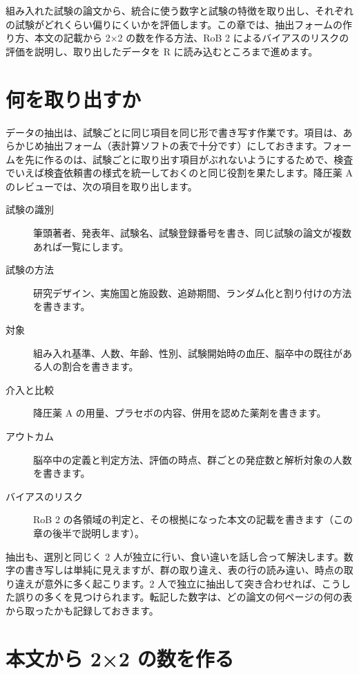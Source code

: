 \begin{chapintro}
組み入れた試験の論文から、統合に使う数字と試験の特徴を取り出し、それぞれの試験がどれくらい偏りにくいかを評価します。この章では、抽出フォームの作り方、本文の記載から 2×2 の数を作る方法、RoB 2 によるバイアスのリスクの評価を説明し、取り出したデータを R に読み込むところまで進めます。
\end{chapintro}

\section{何を取り出すか}
\label{sec:04-1}

データの抽出は、試験ごとに同じ項目を同じ形で書き写す作業です。項目は、あらかじめ抽出フォーム（表計算ソフトの表で十分です）にしておきます。フォームを先に作るのは、試験ごとに取り出す項目がぶれないようにするためで、検査でいえば検査依頼書の様式を統一しておくのと同じ役割を果たします。降圧薬 A のレビューでは、次の項目を取り出します。

\begin{description}
\item[試験の識別] 筆頭著者、発表年、試験名、試験登録番号を書き、同じ試験の論文が複数あれば一覧にします。
\item[試験の方法] 研究デザイン、実施国と施設数、追跡期間、ランダム化と割り付けの方法を書きます。
\item[対象] 組み入れ基準、人数、年齢、性別、試験開始時の血圧、脳卒中の既往がある人の割合を書きます。
\item[介入と比較] 降圧薬 A の用量、プラセボの内容、併用を認めた薬剤を書きます。
\item[アウトカム] 脳卒中の定義と判定方法、評価の時点、群ごとの発症数と解析対象の人数を書きます。
\item[バイアスのリスク] RoB 2 の各領域の判定と、その根拠になった本文の記載を書きます（この章の後半で説明します）。
\end{description}

抽出も、選別と同じく 2 人が独立に行い、食い違いを話し合って解決します。数字の書き写しは単純に見えますが、群の取り違え、表の行の読み違い、時点の取り違えが意外に多く起こります。2 人で独立に抽出して突き合わせれば、こうした誤りの多くを見つけられます。転記した数字は、どの論文の何ページの何の表から取ったかも記録しておきます。

\section{本文から 2×2 の数を作る}
\label{sec:04-2}

